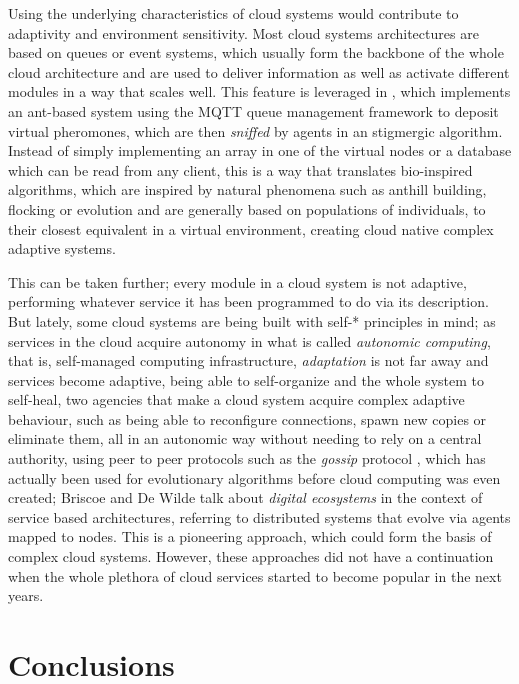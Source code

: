 \documentclass[utf8]{frontiersSCNS} %
\begin{document}
Using the underlying characteristics of cloud systems would
contribute to adaptivity and environment sensitivity.
Most cloud systems architectures are based on queues or event systems, which
usually form the backbone of the whole cloud architecture and are used to deliver
information as well as activate different modules in a way that scales
well. This feature is leveraged in \citep{bottone2016implementing}, which
implements an ant-based system using the MQTT queue management
framework to deposit virtual pheromones, which are then {\em sniffed} by
agents in an stigmergic algorithm. Instead of simply implementing an
array in one of the virtual nodes or a database which can be read from
any client, this is a way that translates bio-inspired algorithms,
which are inspired by natural phenomena such as anthill building,
flocking or evolution and are generally based on populations of
individuals, to
their closest equivalent in a virtual environment, creating cloud
native complex adaptive systems.

This can be taken further; every module in a cloud system is not
adaptive, performing whatever service it has been programmed to do via
its description. But lately, some cloud systems are being built with
self-* principles in mind; as services in the cloud acquire autonomy
in what is called {\em autonomic computing}, that is, self-managed
computing infrastructure, {\em adaptation} is not far away
and services become adaptive, being able to self-organize and the
whole system to self-heal, two agencies that make a cloud system
acquire complex adaptive behaviour, such as being able to reconfigure
connections, spawn new copies or eliminate them, all in an autonomic
way without needing to rely on a central authority, using peer to peer
protocols such as the {\em gossip} protocol \citep{LNCS44480129}, which has
actually been used for evolutionary algorithms \citep{laredo09cache} before
cloud computing was even created;  Briscoe and De Wilde
\citep{DBLP:journals/corr/abs-1101-5428,DBLP:journals/corr/abs-0712-4102}
  talk about {\em digital ecosystems} in the context of service based
  architectures, referring to distributed systems that evolve via
  agents mapped to nodes. This is a pioneering approach, which could
  form the basis of complex cloud systems. However, these approaches
  did not have a continuation when the whole plethora of cloud
  services started to become popular in the next years.

\section{Conclusions}
\end{document}
